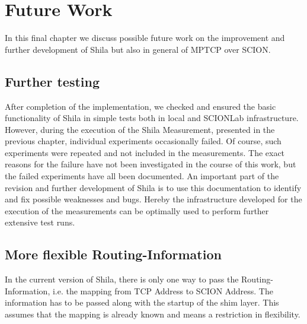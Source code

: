 \chapter{Future Work}
\label{chap:FutureWork}

In this final chapter we discuss possible future work on the improvement and further development of Shila but also in general of MPTCP over SCION.

\section*{Further testing}

After completion of the implementation, we checked and ensured the basic functionality of Shila in simple tests both in local and SCIONLab infrastructure. However, during the execution of the Shila Measurement, presented in the previous chapter, individual experiments occasionally failed. Of course, such experiments were repeated and not included in the measurements. The exact reasons for the failure have not been investigated in the course of this work, but the failed experiments have all been documented. An important part of the revision and further development of Shila is to use this documentation to identify and fix possible weaknesses and bugs. Hereby the infrastructure \cite{} developed for the execution of the measurements can be optimally used to perform further extensive test runs.

\section*{More flexible Routing-Information}

In the current version of Shila, there is only one way to pass the Routing-Information, i.e. the mapping from TCP Address to SCION Address. The information has to be passed along with the startup of the shim layer. This assumes that the mapping is already known and means a restriction in flexibility.  

